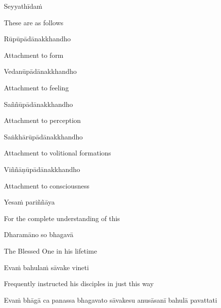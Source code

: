 Seyyathīdaṁ

\begin{english}
  These are as follows
\end{english}

Rūpūpādānakkhandho

\begin{english}
  Attachment to form
\end{english}

Vedanūpādānakkhandho

\begin{english}
  Attachment to feeling
\end{english}

Saññūpādānakkhandho

\begin{english}
  Attachment to perception
\end{english}

Saṅkhārūpādānakkhandho

\begin{english}
  Attachment to volitional formations\hyperlink{endnote16-appendix}{\hypertarget{endnote16-body}{}}
\end{english}

Viññāṇūpādānakkhandho

\begin{english}
  Attachment to consciousness\hyperlink{endnote17-appendix}{\hypertarget{endnote17-body}{}}
\end{english}

Yesaṁ pariññāya

\begin{english}
  For the complete understanding of this
\end{english}

Dharamāno so bhagavā

\begin{english}
  The Blessed One in his lifetime
\end{english}

Evaṁ bahulaṁ sāvake vineti

\begin{english}
  Frequently instructed his disciples in just this way
\end{english}

\begin{pali-hang}
  Evaṁ bhāgā ca panassa bhagavato sāvakesu anusāsanī bahulā pavattati
\end{pali-hang}

